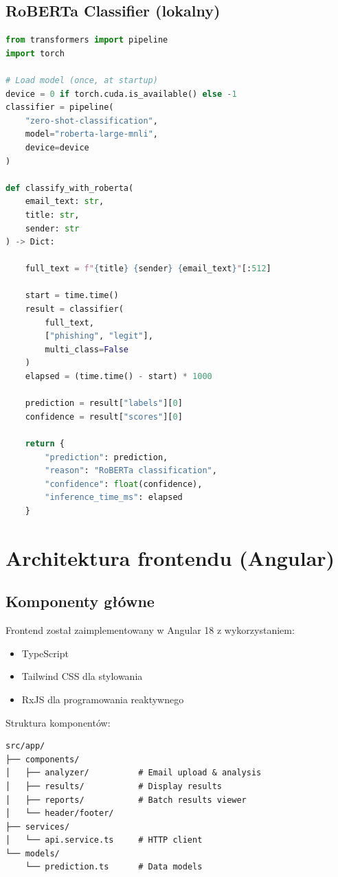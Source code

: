 \documentclass[11pt]{extreport}
\begin{document}
\subsection{RoBERTa Classifier (lokalny)}

\begin{lstlisting}[language=Python, caption={Implementacja RoBERTa}, label={lst:roberta}]
from transformers import pipeline
import torch

# Load model (once, at startup)
device = 0 if torch.cuda.is_available() else -1
classifier = pipeline(
    "zero-shot-classification",
    model="roberta-large-mnli",
    device=device
)

def classify_with_roberta(
    email_text: str, 
    title: str, 
    sender: str
) -> Dict:
    
    full_text = f"{title} {sender} {email_text}"[:512]
    
    start = time.time()
    result = classifier(
        full_text,
        ["phishing", "legit"],
        multi_class=False
    )
    elapsed = (time.time() - start) * 1000
    
    prediction = result["labels"][0]
    confidence = result["scores"][0]
    
    return {
        "prediction": prediction,
        "reason": "RoBERTa classification",
        "confidence": float(confidence),
        "inference_time_ms": elapsed
    }
\end{lstlisting}

\section{Architektura frontendu (Angular)}
\label{sec:frontend}

\subsection{Komponenty główne}

Frontend został zaimplementowany w Angular 18 z wykorzystaniem:
\begin{itemize}
    \item TypeScript
    \item Tailwind CSS dla stylowania
    \item RxJS dla programowania reaktywnego
\end{itemize}

Struktura komponentów:
\begin{verbatim}
src/app/
├── components/
│   ├── analyzer/          # Email upload & analysis
│   ├── results/           # Display results
│   ├── reports/           # Batch results viewer
│   └── header/footer/
├── services/
│   └── api.service.ts     # HTTP client
└── models/
    └── prediction.ts      # Data models
\end{verbatim}
\end{document}
